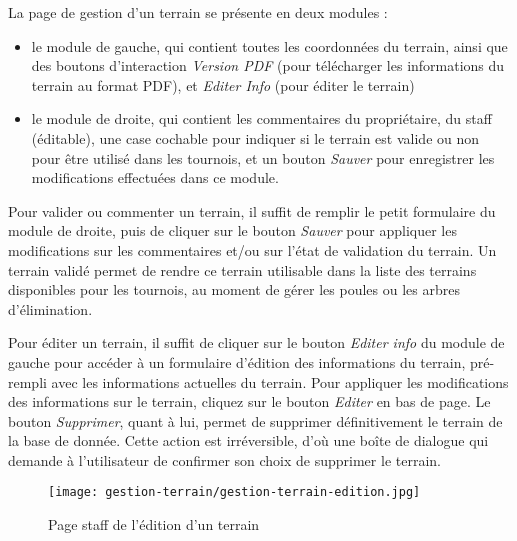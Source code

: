 La page de gestion d'un terrain se présente en deux modules :

\begin{itemize}
\item le module de gauche, qui contient toutes les coordonnées du terrain, ainsi que des boutons d'interaction \textit{Version PDF} (pour télécharger les informations du terrain au format PDF), et \textit{Editer Info} (pour éditer le terrain)
\item le module de droite, qui contient les commentaires du propriétaire, du staff (éditable), une case cochable pour indiquer si le terrain est valide ou non pour être utilisé dans les tournois, et un bouton \textit{Sauver} pour enregistrer les modifications effectuées dans ce module.
\end{itemize}
\bigskip

Pour valider ou commenter un terrain, il suffit de remplir le petit formulaire du module de droite, puis de cliquer sur le bouton \textit{Sauver} pour appliquer les modifications sur les commentaires et/ou sur l'état de validation du terrain. Un terrain validé permet de rendre ce terrain utilisable dans la liste des terrains disponibles pour les tournois, au moment de gérer les poules ou les arbres d'élimination.\newline

Pour éditer un terrain, il suffit de cliquer sur le bouton \textit{Editer info} du module de gauche pour accéder à un formulaire d'édition des informations du terrain, pré-rempli avec les informations actuelles du terrain. Pour appliquer les modifications des informations sur le terrain, cliquez sur le bouton \textit{Editer} en bas de page. Le bouton \textit{Supprimer}, quant à lui, permet de supprimer définitivement le terrain de la base de donnée. Cette action est irréversible, d'où une boîte de dialogue qui demande à l'utilisateur de confirmer son choix de supprimer le terrain.

\begin{figure}[H]
\centering
\texttt{[image: gestion-terrain/gestion-terrain-edition.jpg]}
\caption{Page staff de l'édition d'un terrain}
\end{figure}
